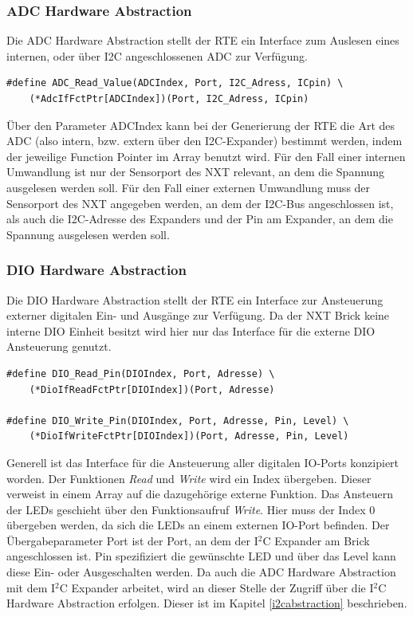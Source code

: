 \subsubsection{ADC Hardware Abstraction}

Die ADC Hardware Abstraction stellt der RTE ein Interface zum Auslesen eines internen, oder über I2C angeschlossenen ADC zur Verfügung. 

\begin{lstlisting}[frame=single]  
#define ADC_Read_Value(ADCIndex, Port, I2C_Adress, ICpin) \
	(*AdcIfFctPtr[ADCIndex])(Port, I2C_Adress, ICpin)
\end{lstlisting}
Über den Parameter ADCIndex kann bei der Generierung der RTE die Art des ADC (also intern, bzw. extern über den I2C-Expander) bestimmt werden, indem der jeweilige Function Pointer im Array benutzt wird. \newline
Für den Fall einer internen Umwandlung ist nur der Sensorport des NXT relevant, an dem die Spannung ausgelesen werden soll.
Für den Fall einer externen Umwandlung muss der Sensorport des NXT angegeben werden, an dem der I2C-Bus angeschlossen ist, als auch die I2C-Adresse des Expanders und der Pin am Expander, an dem die Spannung ausgelesen werden soll. 


\subsubsection{DIO Hardware Abstraction} \label{dio}

Die DIO Hardware Abstraction stellt der RTE ein Interface zur Ansteuerung externer digitalen Ein- und Ausgänge zur Verfügung. Da der NXT Brick keine interne DIO Einheit besitzt wird hier nur das Interface für die externe DIO Ansteuerung genutzt. \newline
\begin{lstlisting}[frame=single, caption={DIO Interface},captionpos=b]  
#define DIO_Read_Pin(DIOIndex, Port, Adresse) \
	(*DioIfReadFctPtr[DIOIndex])(Port, Adresse)
	
#define DIO_Write_Pin(DIOIndex, Port, Adresse, Pin, Level) \
	(*DioIfWriteFctPtr[DIOIndex])(Port, Adresse, Pin, Level)
\end{lstlisting}
Generell ist das Interface für die Ansteuerung aller digitalen IO-Ports konzipiert worden.
Der Funktionen \textit{Read} und \textit{Write} wird ein Index übergeben. Dieser verweist in einem Array auf die dazugehörige externe Funktion. \newline \newline
Das Ansteuern der LEDs geschieht über den Funktionsaufruf \textit{Write}. Hier muss der Index 0 übergeben werden, da sich die LEDs an einem externen IO-Port befinden. Der Übergabeparameter Port ist der Port, an dem der I$^2$C Expander am Brick angeschlossen ist. Pin spezifiziert die gewünschte LED und über das Level kann diese Ein- oder Ausgeschalten werden.  Da auch die ADC Hardware Abstraction mit dem I$^2$C Expander arbeitet, wird an dieser Stelle der Zugriff über die I$^2$C Hardware Abstraction erfolgen. Dieser ist im Kapitel \ref{i2cabstraction} beschrieben.\newline

